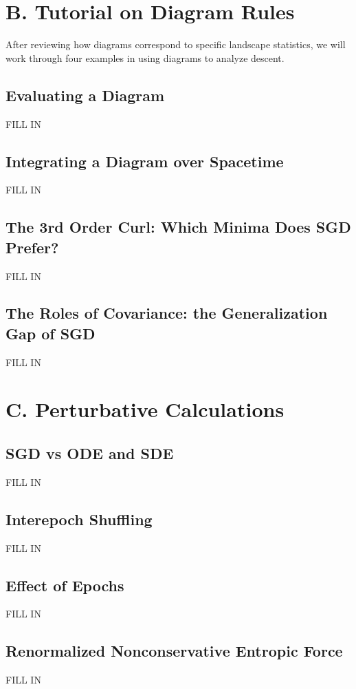 \documentclass{article}
\begin{document}
\section*{B. Tutorial on Diagram Rules}
    After reviewing how diagrams correspond to specific landscape statistics,
    we will work through four examples in using diagrams to analyze descent.

    \subsection*{Evaluating a Diagram}
        {\color{moor} FILL IN}
    \subsection*{Integrating a Diagram over Spacetime}
        {\color{moor} FILL IN}
    \subsection*{The 3rd Order Curl: Which Minima Does SGD Prefer?}
        {\color{moor} FILL IN}
    \subsection*{The Roles of Covariance: the Generalization Gap of SGD}
        {\color{moor} FILL IN}
        
\section*{C. Perturbative Calculations}

    \subsection*{SGD vs ODE and SDE}
        {\color{moor} FILL IN}
    \subsection*{Interepoch Shuffling}
        {\color{moor} FILL IN}
    \subsection*{Effect of Epochs}
        {\color{moor} FILL IN}
    \subsection*{Renormalized Nonconservative Entropic Force}
        {\color{moor} FILL IN}
\end{document}
